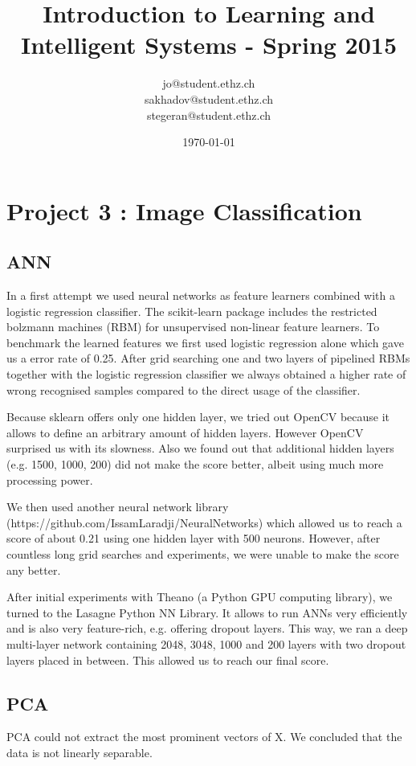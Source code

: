 \documentclass[a4paper, 11pt]{article}
\title{Introduction to Learning and Intelligent Systems - Spring 2015}
\author{jo@student.ethz.ch\\ sakhadov@student.ethz.ch\\  stegeran@student.ethz.ch\\}
\date{\today}
\begin{document}
\maketitle

\section{Project 3 : Image Classification}

\subsection{ANN}
In a first attempt we used neural networks as feature learners combined with a logistic regression classifier. The scikit-learn package includes the restricted bolzmann machines (RBM) for unsupervised non-linear feature learners. To benchmark the learned features we first used logistic regression alone which gave us a error rate of 0.25. After grid searching one and two layers of pipelined RBMs together with the logistic regression classifier we always obtained a higher rate of wrong recognised samples compared to the direct usage of the classifier.

Because sklearn offers only one hidden layer, we tried out OpenCV because it allows to define an arbitrary amount of hidden layers. However OpenCV surprised us with its slowness. Also we found out that additional hidden layers (e.g. 1500, 1000, 200) did not make the score better, albeit using much more processing power.

We then used another neural network library (https://github.com/IssamLaradji/NeuralNetworks) which allowed us to reach a score of about 0.21 using one hidden layer with 500 neurons. However, after countless long grid searches and experiments, we were unable to make the score any better.

After initial experiments with Theano (a Python GPU computing library), we turned to the Lasagne Python NN Library. It allows to run ANNs very efficiently and is also very feature-rich, e.g. offering dropout layers. This way, we ran a deep multi-layer network containing 2048, 3048, 1000 and 200 layers with two dropout layers placed in between. This allowed us to reach our final score.


\subsection{PCA}

PCA could not extract the most prominent vectors of X. We concluded that the data is not linearly separable.
\end{document}
